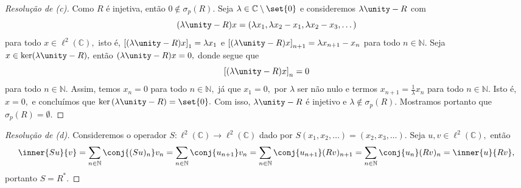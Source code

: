 \begin{proof}[Resolução de (c)]
  Como \(R\) é injetiva, então \(0 \notin \sigma_p(R).\) Seja \(\lambda \in \mathbb{C} \setminus \set{0}\) e consideremos \(\lambda\unity - R\) com
  \begin{equation*}
    (\lambda \unity - R)x = (\lambda x_1, \lambda x_2 - x_1, \lambda x_2 - x_3, \dots)
  \end{equation*}
  para todo \(x \in \ell^2(\mathbb{C}),\) isto é, \(\left[(\lambda \unity - R)x\right]_1 = \lambda x_1\) e \(\left[(\lambda \unity - R)x\right]_{n+1} = \lambda x_{n+1} - x_n\) para todo \(n \in \mathbb{N}.\)
  Seja \(x \in \ker(\lambda \unity - R),\) então \((\lambda \unity - R)x = 0,\) donde segue que
  \begin{equation*}
    \left[(\lambda \unity - R)x\right]_n = 0
  \end{equation*}
  para todo \(n \in \mathbb{N}.\) Assim, temos \(x_n = 0\) para todo \(n \in \mathbb{N},\) já que \(x_1 = 0,\) por \(\lambda\) ser não nulo e termos \(x_{n+1} = \frac{1}{\lambda} x_n\) para todo \(n \in \mathbb{N}.\) Isto é, \(x = 0,\) e concluímos que \(\ker{(\lambda \unity - R)} = \set{0}.\) Com isso, \(\lambda \unity - R\) é injetivo e \(\lambda \notin \sigma_p(R).\) Mostramos portanto que \(\sigma_p(R) = \emptyset.\)
\end{proof}
\begin{proof}[Resolução de (d)]
  Consideremos o operador \(S : \ell^2(\mathbb{C}) \to \ell^2(\mathbb{C})\) dado por \(S(x_1, x_2, \dots) = (x_2, x_3, \dots).\) Seja \(u, v \in \ell^2(\mathbb{C}),\) então
  \begin{equation*}
    \inner{Su}{v} = \sum_{n \in \mathbb{N}}{\conj{(Su)_n}v_n}
    = \sum_{n\in\mathbb{N}}{\conj{u_{n+1}}v_{n}}
    = \sum_{n \in \mathbb{N}}{\conj{u_{n+1}}(Rv)_{n+1}}
    = \sum_{n\in\mathbb{N}}{\conj{u_n}(Rv)_n}
    = \inner{u}{Rv},
  \end{equation*}
  portanto \(S = R^*.\)
\end{proof}
